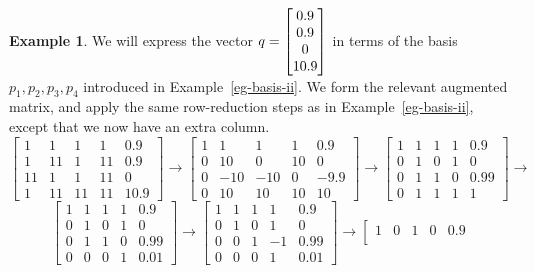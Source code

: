 \documentclass[reqno]{amsart}
\theoremstyle{definition}
\newtheorem{example}[theorem]{Example}
\begin{document}
\begin{example}
 We will express the vector $q=\left[\begin{matrix} 0.9 \\ 0.9 \\ 0 \\ 10.9 \end{matrix}\right]$ in terms
 of the basis $p_1,p_2,p_3,p_4$ introduced in Example~\ref{eg-basis-ii}.
 We form the relevant augmented matrix, and apply the same
 row-reduction steps as in Example~\ref{eg-basis-ii}, except that we now
 have an extra column.
 \[ \left[\begin{array}{cccc|c}
          1 &  1 &  1 &  1 &  0.9\\
          1 & 11 &  1 & 11 &  0.9\\
         11 &  1 &  1 & 11 &  0  \\
          1 & 11 & 11 & 11 & 10.9
    \end{array}\right]
    \to
    \left[\begin{array}{cccc|c}
          1 &  1 &  1 &  1 & 0.9 \\
          0 & 10 &  0 & 10 & 0   \\
          0 &-10 &-10 &  0 & -9.9\\
          0 & 10 & 10 & 10 & 10
    \end{array}\right]
    \to
    \left[\begin{array}{cccc|c}
          1 &  1 &  1 &  1 & 0.9 \\
          0 &  1 &  0 &  1 & 0   \\
          0 &  1 &  1 &  0 & 0.99\\
          0 &  1 &  1 &  1 & 1
    \end{array}\right]
    \to
 \] \[
    \left[\begin{array}{cccc|c}
          1 &  1 &  1 &  1 & 0.9 \\
          0 &  1 &  0 &  1 & 0   \\
          0 &  1 &  1 &  0 & 0.99 \\
          0 &  0 &  0 &  1 & 0.01
    \end{array}\right]
    \to
    \left[\begin{array}{cccc|c}
          1 &  1 &  1 &  1 & 0.9 \\
          0 &  1 &  0 &  1 & 0   \\
          0 &  0 &  1 & -1 & 0.99\\
          0 &  0 &  0 &  1 & 0.01
    \end{array}\right]
    \to
    \left[\begin{array}{cccc|c}
          1 &  0 &  1 &  0 & 0.9 \\

\end{array}\]
\end{example}
\end{document}
